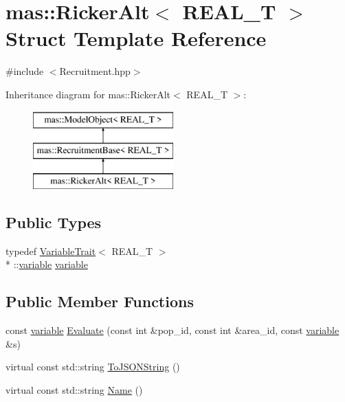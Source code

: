\hypertarget{structmas_1_1_ricker_alt}{\section{mas\-:\-:Ricker\-Alt$<$ R\-E\-A\-L\-\_\-\-T $>$ Struct Template Reference}
\label{structmas_1_1_ricker_alt}
}


{\ttfamily \#include $<$Recruitment.\-hpp$>$}

Inheritance diagram for mas\-:\-:Ricker\-Alt$<$ R\-E\-A\-L\-\_\-\-T $>$\-:\begin{figure}[H]
\begin{center}
\leavevmode
\includegraphics[height=3.000000cm]{structmas_1_1_ricker_alt}
\end{center}
\end{figure}
\subsection*{Public Types}
\begin{DoxyCompactItemize}
\item 
typedef \hyperlink{structmas_1_1_variable_trait}{Variable\-Trait}$<$ R\-E\-A\-L\-\_\-\-T $>$\\*
\-::\hyperlink{structmas_1_1_ricker_alt_a3f6410d01fd55ca163120cb17b862cd8}{variable} \hyperlink{structmas_1_1_ricker_alt_a3f6410d01fd55ca163120cb17b862cd8}{variable}
\end{DoxyCompactItemize}
\subsection*{Public Member Functions}
\begin{DoxyCompactItemize}
\item 
const \hyperlink{structmas_1_1_ricker_alt_a3f6410d01fd55ca163120cb17b862cd8}{variable} \hyperlink{structmas_1_1_ricker_alt_a856496f34bee8e696a55a5960edd5b4e}{Evaluate} (const int \&pop\-\_\-id, const int \&area\-\_\-id, const \hyperlink{structmas_1_1_ricker_alt_a3f6410d01fd55ca163120cb17b862cd8}{variable} \&s)
\item 
virtual const std\-::string \hyperlink{structmas_1_1_ricker_alt_a76187fc316998d57d245c189560bcade}{To\-J\-S\-O\-N\-String} ()
\item 
virtual const std\-::string \hyperlink{structmas_1_1_ricker_alt_a35f2678bc6e8c8b32691daca09bcca93}{Name} ()
\end{DoxyCompactItemize}
